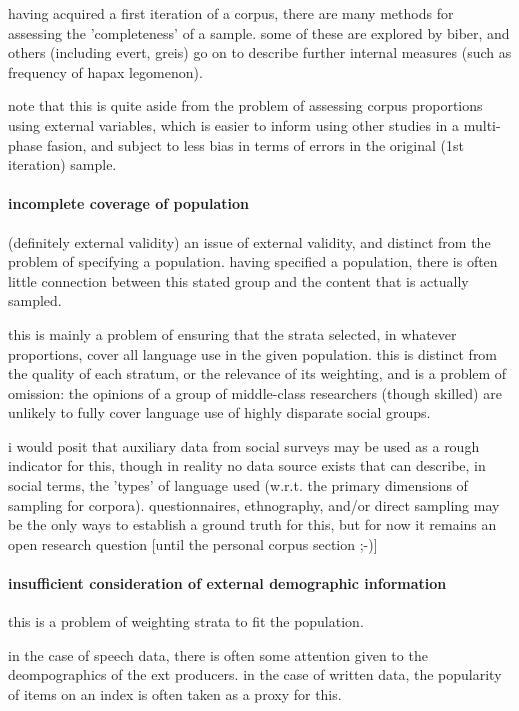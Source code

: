 having acquired a first iteration of a corpus, there are many methods for assessing the 'completeness' of a sample.  some of these are explored by biber, and others (including evert, greis) go on to describe further internal measures (such as frequency of hapax legomenon).

note that this is quite aside from the problem of assessing corpus proportions using external variables, which is easier to inform using other studies in a multi-phase fasion, and subject to less bias in terms of errors in the original (1st iteration) sample.


\paragraph{ incomplete coverage of population }
(definitely external validity)
an issue of external validity, and distinct from the problem of specifying a population.  having specified a population, there is often little connection between this stated group and the content that is actually sampled.

this is mainly a problem of ensuring that the strata selected, in whatever proportions, cover all language use in the given population.  this is distinct from the quality of each stratum, or the relevance of its weighting, and is a problem of omission: the opinions of a group of middle-class researchers (though skilled) are unlikely to fully cover language use of highly disparate social groups.

i would posit that auxiliary data from social surveys may be used as a rough indicator for this, though in reality no data source exists that can describe, in social terms, the 'types' of language used (w.r.t. the primary dimensions of sampling for corpora).  questionnaires, ethnography, and/or direct sampling may be the only ways to establish a ground truth for this, but for now it remains an open research question [until the personal corpus section ;-)]





\paragraph{ insufficient consideration of external demographic information}
this is a problem of weighting strata to fit the population.  

in the case of speech data, there is often some attention given to the deompographics of the ext producers.  in the case of written data, the popularity of items on an index is often taken as a proxy for this.  

